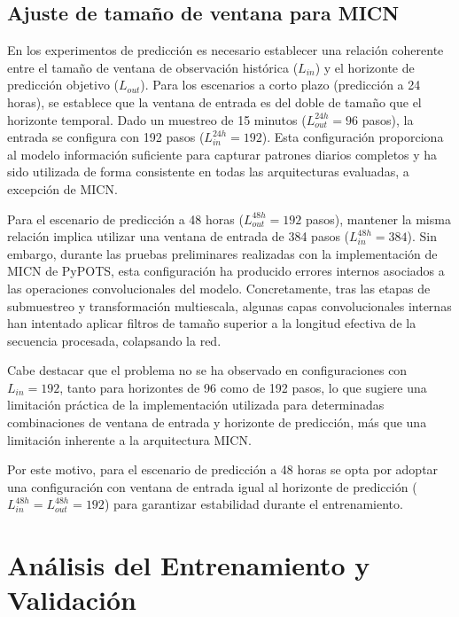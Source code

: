 \subsection{Ajuste de tamaño de ventana para MICN}

En los experimentos de predicción es necesario establecer una relación coherente entre el tamaño de ventana de observación histórica ($L_{in}$) y el horizonte de predicción objetivo ($L_{out}$). Para los escenarios a corto plazo (predicción a 24 horas), se establece que la ventana de entrada es del doble de tamaño que el horizonte temporal. Dado un muestreo de 15 minutos ($L_{out}^{24h}=96$ pasos), la entrada se configura con 192 pasos ($L_{in}^{24h}=192$). Esta configuración proporciona al modelo información suficiente para capturar patrones diarios completos y ha sido utilizada de forma consistente en todas las arquitecturas evaluadas, a excepción de MICN.

Para el escenario de predicción a 48 horas ($L_{out}^{48h}=192$ pasos), mantener la misma relación implica utilizar una ventana de entrada de 384 pasos ($L_{in}^{48h}=384$). Sin embargo, durante las pruebas preliminares realizadas con la implementación de MICN de PyPOTS, esta configuración ha producido errores internos asociados a las operaciones convolucionales del modelo. Concretamente, tras las etapas de submuestreo y transformación multiescala, algunas capas convolucionales internas han intentado aplicar filtros de tamaño superior a la longitud efectiva de la secuencia procesada, colapsando la red.

Cabe destacar que el problema no se ha observado en configuraciones con $L_{in}=192$, tanto para horizontes de 96 como de 192 pasos, lo que sugiere una limitación práctica de la implementación utilizada para determinadas combinaciones de ventana de entrada y horizonte de predicción, más que una limitación inherente a la arquitectura MICN.

Por este motivo, para el escenario de predicción a 48 horas se opta por adoptar una configuración con ventana de entrada igual al horizonte de predicción ($L_{in}^{48h}=L_{out}^{48h}=192$) para garantizar estabilidad durante el entrenamiento.





\section{Análisis del Entrenamiento y Validación}
\label{sec:training_validation_results}

